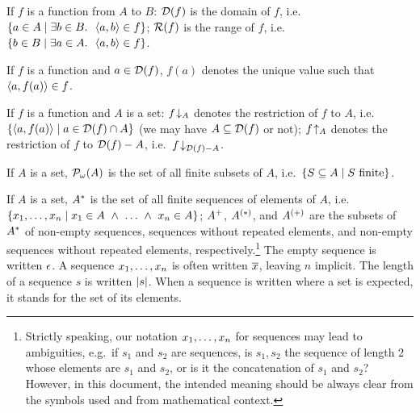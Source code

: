 If $f$ is a function from $A$ to $B$: $\mathcal{D}(f)$ is the domain of $f$, i.e.\
$\{a\in A\mid\exists b\in B.\ \ \langle a,b\rangle\in f\}$; $\mathcal{R}(f)$ is the range of
$f$, i.e.\ $\{b\in B\mid\exists a\in A.\ \ \langle a,b\rangle\in f\}$.

If $f$ is a function and $a\in\mathcal{D}(f)$, $f(a)$ denotes the unique value such
that $\langle a,f(a)\rangle\in f$.

If $f$ is a function and $A$ is a set: $f\!\downarrow_{A}$ denotes the restriction
of $f$ to $A$, i.e.\ $\{\langle a,f(a)\rangle\mid a\in\mathcal{D}(f)\cap A\}$ (we may have
$A\subseteq\mathcal{D}(f)$ or not); $f\!\uparrow_{A}$ denotes the restriction of $f$
to $\mathcal{D}(f)-A$, i.e.\ $f\!\downarrow_{\mathcal{D}(f)-A}$.

If $A$ is a set, $\mathcal{P}_\omega(A)$ is the set of all finite subsets of $A$, i.e.\
$\{S\subseteq A\mid S\mbox{ finite}\}$.

If $A$ is a set, $A^\ast$ is the set of all finite sequences of elements of
$A$, i.e.\ $\{x_1,\ldots,x_n\mid x_1\in A\ \wedge\ \ldots\ \wedge\  x_n\in A\}$;
$A^+$, $A^{(\ast)}$, and $A^{(+)}$ are the subsets of $A^\ast$ of
non-empty sequences, sequences without repeated elements, and non-empty
sequences without repeated elements, respectively.\footnote{Strictly speaking,
our notation $x_1,\ldots,x_n$ for sequences may lead to ambiguities, e.g.\ if
$s_1$ and $s_2$ are sequences, is $s_1,s_2$ the sequence of length 2 whose
elements are $s_1$ and $s_2$, or is it the concatenation of $s_1$ and $s_2$?
However, in this document, the intended meaning should be always clear from the
symbols used and from mathematical context.} The empty sequence is written
$\epsilon$. A sequence $x_1,\ldots,x_n$ is often written $\overline{x}$, leaving $n$
implicit. The length of a sequence $s$ is written $|s|$.  When a sequence
is written where a set is expected, it stands for the set of its elements.
